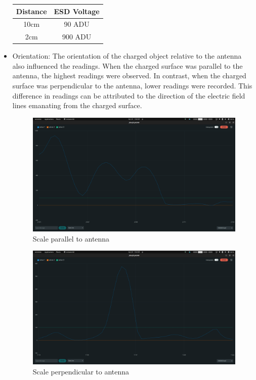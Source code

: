 \documentclass[a4paper,11pt]{article}%
\begin{document}
\begin{itemize}
        \begin{table}[H]
          \centering
          \begin{tabular}{|c|c|}
            \hline
            Distance & ESD Voltage \\
            \hline
            10cm     & 90 ADU      \\
            2cm      & 900 ADU     \\

            \hline
          \end{tabular}
        \end{table}


  \item Orientation: The orientation of the charged object relative to the antenna also influenced the readings. When the charged surface was parallel to the antenna, the highest readings were observed. In contrast, when the charged surface was perpendicular to the antenna, lower readings were recorded. This difference in readings can be attributed to the direction of the electric field lines emanating from the charged surface.



        \begin{figure}[H]
          \centering
          \includegraphics[scale=0.2]{figures/scale.png}
          \caption{Scale parallel to antenna}
        \end{figure}

        \begin{figure}[H]
          \centering
          \includegraphics[scale=0.2]{figures/scale_perpenndicular.png}
          \caption{Scale perpendicular to antenna}
        \end{figure}



\end{itemize}
\end{document}
